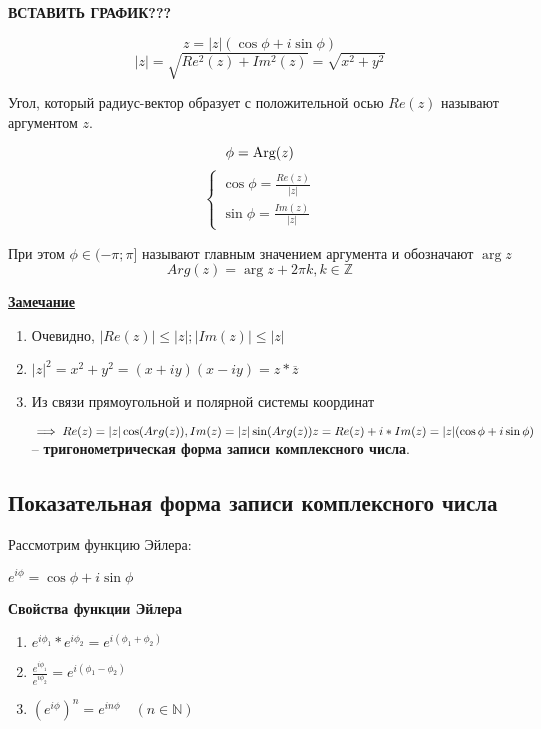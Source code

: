 \documentclass{article}
\newcommand{\parspace}{\vspace{10pt}}
\begin{document}
\textbf{ВСТАВИТЬ ГРАФИК???}

\[z = |z|(\cos \phi + i \sin \phi)\]
\[|z| = \sqrt{Re^2(z) + Im^2(z)} = \sqrt{x^2 + y^2}\]

Угол, который радиус-вектор образует с положительной осью $Re(z)$
называют аргументом $z$.

\[\phi = \textnormal{Arg}(z)\]
\[
    \begin{cases}
        \cos \phi = \frac{Re(z)}{|z|} \\
        \sin \phi = \frac{Im(z)}{|z|}
    \end{cases}
\]

При этом $\phi \in (-\pi; \pi]$ называют главным значением аргумента и обозначают $\arg z$
\[Arg(z) = \arg z + 2 \pi k, k \in \mathbb{Z}\]

\parspace

\underline{\textbf{Замечание}}

\begin{enumerate}
    \item Очевидно, $|Re(z)| \le |z|; |Im(z)| \le |z|$
    \item $|z|^2 = x^2 + y^2 = (x + iy)(x - iy) = z * \overline{z}$
    \item Из связи прямоугольной и полярной системы координат 
    
    $\implies Re(z) = |z| \cos (Arg(z)), Im(z) = |z| \sin (Arg(z)) \\
    z = Re(z) + i*Im(z) = |z|(\cos \phi + i \sin \phi)$ -- \textbf{тригонометрическая
    форма записи комплексного числа}.
\end{enumerate}

\subsection{Показательная форма записи комплексного числа}

Рассмотрим функцию Эйлера:

$e^{i \phi} = \cos \phi + i \sin \phi$

\parspace

\textbf{Свойства функции Эйлера}

\begin{enumerate}
    \item $e^{i \phi_1} * e^{i \phi_2} = e^{i(\phi_1 + \phi_2)}$
    \item $\frac{e^{i \phi_1}}{e^{i \phi_2}} = e^{i(\phi_1 - \phi_2)}$
    \item $(e^{i \phi})^n = e^{i n \phi} \quad (n \in \mathbb{N})$
\end{enumerate}
\end{document}
